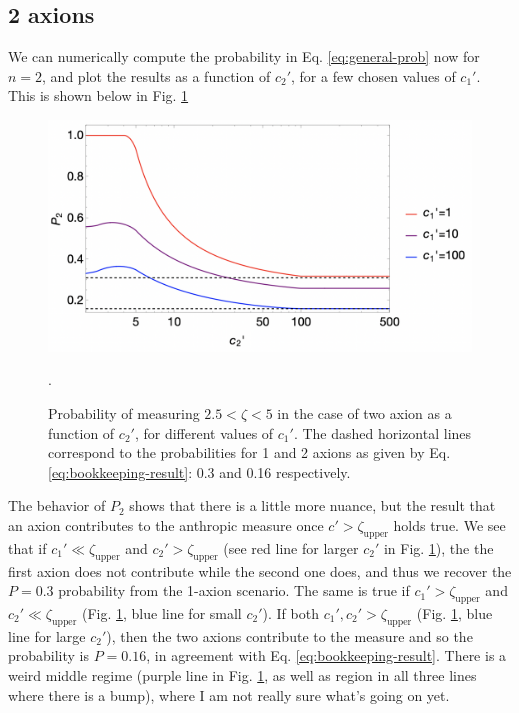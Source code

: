 \documentclass[11pt]{article}
\begin{document}
\subsection{2 axions}
\label{subsec:2-axions}

We can numerically compute the probability in Eq. \eqref{eq:general-prob} now for $n=2$, and plot the results as a function of $c_2'$, for a few chosen values of $c_1'$. This is shown below in Fig. \ref{fig:2axion-prob}

\begin{figure}[h]
    \includegraphics[scale=0.5]{figs/2axion-prob.jpeg}
    \centering
    \caption{Probability of measuring $2.5<\zeta<5$ in the case of two axion as a function of $c_2'$, for different values of $c_1'$. The dashed horizontal lines correspond to the probabilities for 1 and 2 axions as given by Eq. \eqref{eq:bookkeeping-result}: 0.3 and 0.16 respectively.}.
    \label{fig:2axion-prob}
\end{figure}

The behavior of $P_2$ shows that there is a little more nuance, but the result that an axion contributes to the anthropic measure once $c'>\zeta_\text{upper}$ holds true. We see that if $c_1'\ll\zeta_\text{upper}$ and $c_2'>\zeta_\text{upper}$ (see red line for larger $c_2'$ in Fig. \ref{fig:2axion-prob}), the the first axion does not contribute while the second one does, and thus we recover the $P=0.3$ probability from the 1-axion scenario. The same is true if $c_1'>\zeta_\text{upper}$ and $c_2'\ll\zeta_\text{upper}$ (Fig. \ref{fig:2axion-prob}, blue line for small $c_2'$). If both $c_1',c_2'>\zeta_\text{upper}$ (Fig. \ref{fig:2axion-prob}, blue line for large $c_2'$), then the two axions contribute to the measure and so the probability is $P=0.16$, in agreement with Eq. \eqref{eq:bookkeeping-result}. There is a weird middle regime (purple line in Fig. \ref{fig:2axion-prob}, as well as region in all three lines where there is a bump), where I am not really sure what's going on yet. 
\end{document}
